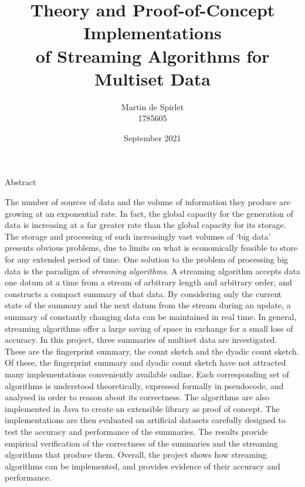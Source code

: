 \documentclass[
  10pt,
  a4paper,
  twoside,
  openright,
]{book}
\title{Theory and Proof-of-Concept Implementations \\ of Streaming Algorithms for Multiset Data}
\author{Martin de Spirlet \\ 1785605}
\date{September 2021}
\begin{document}
\maketitle

\pagestyle{fancy}

\frontmatter

\begin{frontsection}{Abstract}

  The number of sources of data and the volume of information they produce are growing at an exponential rate.
  In fact, the global capacity for the generation of data is increasing at a far greater rate than the global capacity for its storage.
  The storage and processing of such increasingly vast volumes of `big data' presents obvious problems, due to limits on what is economically feasible to store for any extended period of time.
  One solution to the problem of processing big data is the paradigm of \emph{streaming algorithms}.
  A streaming algorithm accepts data one datum at a time from a stream of arbitrary length and arbitrary order, and constructs a compact summary of that data.
  By considering only the current state of the summary and the next datum from the stream during an update, a summary of constantly changing data can be maintained in real time.
  In general, streaming algorithms offer a large saving of space in exchange for a small loss of accuracy.
  In this project, three summaries of multiset data are investigated.
  These are the fingerprint summary, the count sketch and the dyadic count sketch.
  Of these, the fingerprint summary and dyadic count sketch have not attracted many implementations conveniently available online.
  Each corresponding set of algorithms is understood theoretically, expressed formally in pseudocode, and analysed in order to reason about its correctness.
  The algorithms are also implemented in Java to create an extensible library as proof of concept.
  The implementations are then evaluated on artificial datasets carefully designed to test the accuracy and performance of the summaries.
  The results provide empirical verification of the correctness of the summaries and the streaming algorithms that produce them.
  Overall, the project shows how streaming algorithms can be implemented, and provides evidence of their accuracy and performance.
\end{frontsection}

\tableofcontents

\mainmatter


\end{document}
